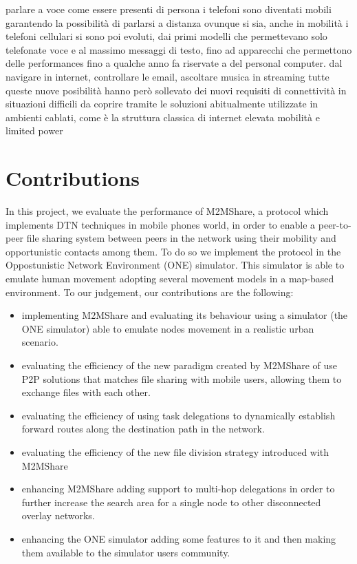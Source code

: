 parlare a voce come essere presenti di persona
i telefoni sono diventati mobili garantendo la possibilità di parlarsi a distanza ovunque si sia, anche in mobilità
i telefoni cellulari si sono poi evoluti, dai primi modelli che permettevano solo telefonate voce e al massimo messaggi di testo, fino ad apparecchi che permettono delle performances fino a qualche anno fa riservate a del personal computer.
dal navigare in internet, controllare le email, ascoltare musica in streaming
tutte queste nuove posibilità hanno però sollevato dei nuovi requisiti di connettività in situazioni difficili da coprire tramite le soluzioni abitualmente utilizzate in ambienti cablati, come è la struttura classica di internet
elevata mobilità e limited power



\section{Contributions}
In this project, we evaluate the performance of M2MShare, a protocol which implements DTN techniques in mobile phones world, in order to enable a peer-to-peer file sharing system between peers in the network using their mobility and opportunistic contacts among them. To do so we implement the protocol in the Oppostunistic Network Environment (ONE) simulator. This simulator is able to emulate human movement adopting several movement models in a map-based environment. To our judgement, our contributions are the following:
\begin{itemize}
\item implementing M2MShare and evaluating its behaviour using a simulator (the ONE simulator) able to emulate nodes movement in a realistic urban scenario.
\item evaluating the efficiency of the new paradigm created by M2MShare of use P2P solutions that matches file sharing with mobile users, allowing them to exchange files with each other.
\item evaluating the efficiency of using task delegations to dynamically establish forward routes along the destination path in the network.
\item evaluating the efficiency of the new file division strategy introduced with M2MShare 
\item enhancing M2MShare adding support to multi-hop delegations in order to further increase the search area for a single node to other disconnected overlay networks.
\item enhancing the ONE simulator adding some features to it and then making them available to the simulator users community.
\end{itemize}

